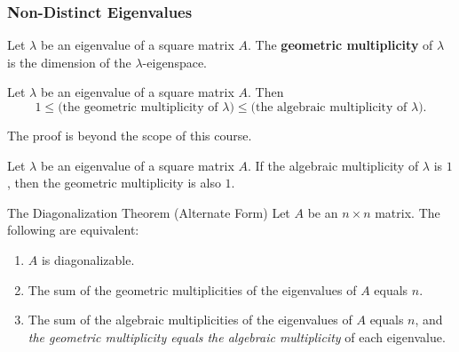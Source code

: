 \begin{frame}
\frametitle{Non-Distinct Eigenvalues}

\vskip -3mm
\begin{defn}
  Let $\lambda$ be an eigenvalue of a square matrix $A$.  The 
  \textbf{geometric multiplicity} of $\lambda$ is the dimension of the
  $\lambda$-eigenspace. 
\end{defn}

\pause
\begin{thm}
  Let $\lambda$ be an eigenvalue of a square matrix $A$.  Then
  \displayskips{3pt}
  \[ 1 \leq \text{(the geometric multiplicity of $\lambda$)}
  \leq \text{(the algebraic multiplicity of $\lambda$)}. \]
\end{thm}

\pause\vskip-1mm
The proof is beyond the scope of this course.

\pause\smallskip
\begin{cor}
  Let $\lambda$ be an eigenvalue of a square matrix $A$.  If the algebraic
  multiplicity of $\lambda$ is $1$, then the geometric multiplicity is also $1$.
\end{cor}

\pause
\begin{oneoffthm}{The Diagonalization Theorem (Alternate Form)}
  Let $A$ be an $n\times n$ matrix.  The following are equivalent:
  \begin{enumerate}
    \pause
  \item $A$ is diagonalizable.
    \pause
  \item The sum of the geometric multiplicities of the eigenvalues of $A$ equals
    $n$.
    \pause
  \item The sum of the algebraic multiplicities of the eigenvalues of $A$ equals
    $n$, and \emph{the geometric multiplicity equals the algebraic multiplicity} of
    each eigenvalue.
  \end{enumerate}
\end{oneoffthm}

\end{frame}



